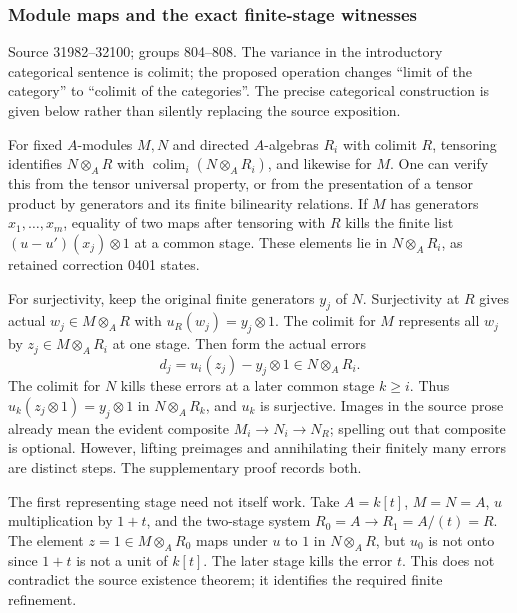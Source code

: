 \subsubsection{Module maps and the exact finite-stage witnesses}\label{algebra-proof-036-module-maps-and-the-exact-finite-stage-witnesses}

Source 31982--32100; groups 804--808. The variance in the introductory categorical sentence is colimit; the proposed operation changes ``limit of the category'' to ``colimit of the categories''. The precise categorical construction is given below rather than silently replacing the source exposition.

For fixed \(A\)-modules \(M,N\) and directed \(A\)-algebras \(R_i\) with colimit \(R\), tensoring identifies \(N\otimes_A R\) with \(\operatorname{colim}_i(N\otimes_A R_i)\), and likewise for \(M\). One can verify this from the tensor universal property, or from the presentation of a tensor product by generators and its finite bilinearity relations. If \(M\) has generators \(x_1,\ldots,x_m\), equality of two maps after tensoring with \(R\) kills the finite list \((u-u')(x_j)\otimes1\) at a common stage. These elements lie in \(N\otimes_A R_i\), as retained correction 0401 states.

For surjectivity, keep the original finite generators \(y_j\) of \(N\). Surjectivity at \(R\) gives actual \(w_j\in M\otimes_A R\) with \(u_R(w_j)=y_j\otimes1\). The colimit for \(M\) represents all \(w_j\) by \(z_j\in M\otimes_A R_i\) at one stage. Then form the actual errors \[
d_j=u_i(z_j)-y_j\otimes1\in N\otimes_A R_i.
\] The colimit for \(N\) kills these errors at a later common stage \(k\ge i\). Thus \(u_k(z_j\otimes1)=y_j\otimes1\) in \(N\otimes_A R_k\), and \(u_k\) is surjective. Images in the source prose already mean the evident composite \(M_i\to N_i\to N_R\); spelling out that composite is optional. However, lifting preimages and annihilating their finitely many errors are distinct steps. The supplementary proof records both.

The first representing stage need not itself work. Take \(A=k[t]\), \(M=N=A\), \(u\) multiplication by \(1+t\), and the two-stage system \(R_0=A\to R_1=A/(t)=R\). The element \(z=1\in M\otimes_A R_0\) maps under \(u\) to \(1\) in \(N\otimes_A R\), but \(u_0\) is not onto since \(1+t\) is not a unit of \(k[t]\). The later stage kills the error \(t\). This does not contradict the source existence theorem; it identifies the required finite refinement.


